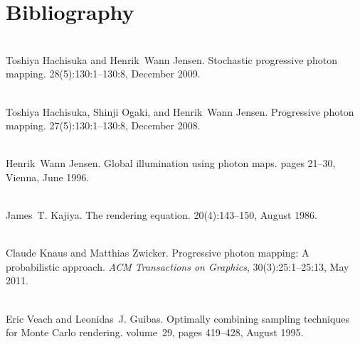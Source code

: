 \chapter{Bibliography}
\hypertarget{citelist}{}\label{citelist}

\begin{DoxyDescription}
\item[\label{citelist_CITEREF_Hachisuka:2009:Stochastic}%
\Hypertarget{citelist_CITEREF_Hachisuka:2009:Stochastic}%
\mbox{[}1\mbox{]}]\hfill \\
Toshiya Hachisuka and Henrik~Wann Jensen. Stochastic progressive photon mapping. 28(5)\+:130\+:1--130\+:8, December 2009. 


\item[\label{citelist_CITEREF_Hachisuka:2008:Progressive}%
\Hypertarget{citelist_CITEREF_Hachisuka:2008:Progressive}%
\mbox{[}2\mbox{]}]\hfill \\
Toshiya Hachisuka, Shinji Ogaki, and Henrik~Wann Jensen. Progressive photon mapping. 27(5)\+:130\+:1--130\+:8, December 2008. 


\item[\label{citelist_CITEREF_Jensen:1996:Global}%
\Hypertarget{citelist_CITEREF_Jensen:1996:Global}%
\mbox{[}3\mbox{]}]\hfill \\
Henrik~Wann Jensen. Global illumination using photon maps. pages 21--30, Vienna, June 1996. 


\item[\label{citelist_CITEREF_Kajiya:1986:Rendering}%
\Hypertarget{citelist_CITEREF_Kajiya:1986:Rendering}%
\mbox{[}4\mbox{]}]\hfill \\
James~T. Kajiya. The rendering equation. 20(4)\+:143--150, August 1986. 


\item[\label{citelist_CITEREF_Knaus:2011:Progressive}%
\Hypertarget{citelist_CITEREF_Knaus:2011:Progressive}%
\mbox{[}5\mbox{]}]\hfill \\
Claude Knaus and Matthias Zwicker. Progressive photon mapping\+: A probabilistic approach. {\itshape ACM Transactions on Graphics}, 30(3)\+:25\+:1--25\+:13, May 2011. 


\item[\label{citelist_CITEREF_Veach:1995:Optimally}%
\Hypertarget{citelist_CITEREF_Veach:1995:Optimally}%
\mbox{[}6\mbox{]}]\hfill \\
Eric Veach and Leonidas~J. Guibas. Optimally combining sampling techniques for Monte Carlo rendering. volume~29, pages 419--428, August 1995. 


\end{DoxyDescription}